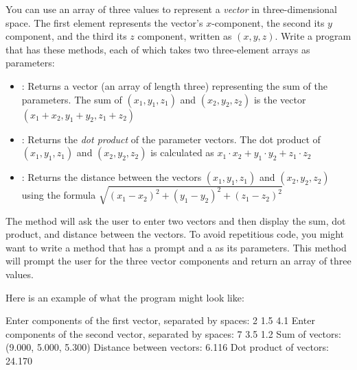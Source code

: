 \begin{exercise}
\label{ex:vectors}

You can use an array of three  values to represent a {\em vector} in three-dimensional space. The first element represents the vector's $x$-component, the second its $y$ component, and the third its $z$ component, written as $(x, y, z)$. Write a program that has these methods, each of which takes two three-element arrays as parameters:
\begin{itemize}
\item {}: Returns a vector (an array of length three) representing the sum of the parameters. The sum of $(x_1, y_1, z_1)$ and $(x_2, y_2, z_2)$ is the vector $(x_1 + x_2, y_1 + y_2, z_1 + z_2)$
\item {}: Returns the {\em dot product} of the parameter vectors. The dot product of  $(x_1, y_1, z_1)$ and $(x_2, y_2, z_2)$ is calculated as $x_1\cdot x_2 + y_1\cdot y_2 + z_1\cdot z_2$ 
\item {}: Returns the distance between the vectors $(x_1, y_1, z_1)$ and $(x_2, y_2, z_2)$ using the formula $\sqrt{(x_1 - x_2)^2 + (y_1 - y_2)^2 + (z_1 - z_2)^2}$
\end{itemize}

The  method will ask the user to enter two vectors and then display the sum, dot product, and distance between the vectors. To avoid repetitious code, you might want to write a  method that has a prompt and a  as its parameters. This method will prompt the user for the three vector components and return an array of three  values.

Here is an example of what the program might look like:

\begin{stdout}
Enter components of the first vector,
separated by spaces: 2 1.5 4.1
Enter components of the second vector,
separated by spaces: 7 3.5 1.2
Sum of vectors: (9.000, 5.000, 5.300)
Distance between vectors: 6.116
Dot product of vectors: 24.170
\end{stdout}

\end{exercise}


